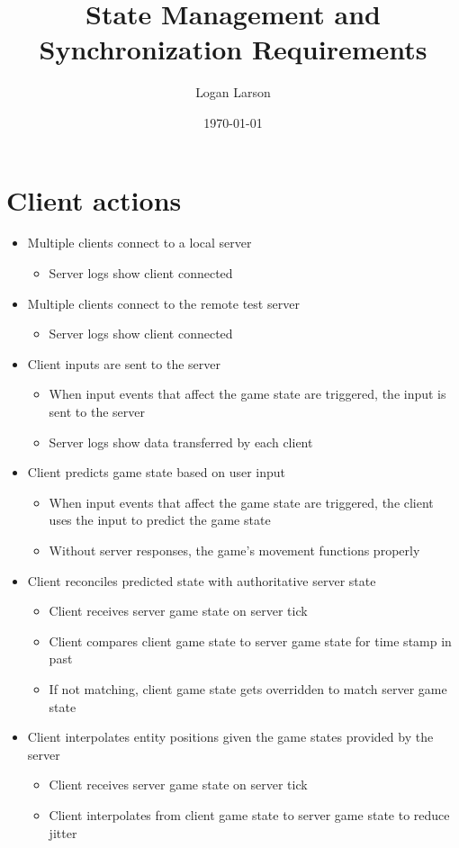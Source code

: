 \documentclass{article}
\title{State Management and Synchronization Requirements}
\author{Logan Larson}
\date{\today}
\begin{document}
\maketitle

\section{Client actions}
\begin{itemize}
		\item Multiple clients connect to a local server
    \begin{itemize}
		    \item Server logs show client connected
    \end{itemize}
		\item Multiple clients connect to the remote test server
    \begin{itemize}
				\item Server logs show client connected
    \end{itemize}
	  \item Client inputs are sent to the server
    \begin{itemize}
				\item When input events that affect the game state are triggered, the input is sent to the server
				\item Server logs show data transferred by each client
    \end{itemize}
		\item Client predicts game state based on user input
    \begin{itemize}
				\item When input events that affect the game state are triggered, the client uses the input to predict the game state
				\item Without server responses, the game's movement functions properly
    \end{itemize}
		\item Client reconciles predicted state with authoritative server state
    \begin{itemize}
				\item Client receives server game state on server tick
				\item Client compares client game state to server game state for time stamp in past
				\item If not matching, client game state gets overridden to  match server game state
    \end{itemize}
		\item Client interpolates entity positions given the game states provided by the server
    \begin{itemize}
				\item Client receives server game state on server tick
				\item Client interpolates from client game state to server game state to reduce jitter
    \end{itemize}
\end{itemize}
\end{document}
